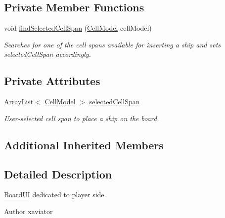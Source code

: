 \subsection*{Private Member Functions}
\begin{DoxyCompactItemize}
\item 
void \hyperlink{classbattleship2D_1_1ui_1_1BoardUIPlayer_a682280776c3f98231aa0624d783566cb}{find\-Selected\-Cell\-Span} (\hyperlink{classbattleship2D_1_1model_1_1CellModel}{Cell\-Model} cell\-Model)
\begin{DoxyCompactList}\small\item\em Searches for one of the cell spans available for inserting a ship and sets selected\-Cell\-Span accordingly. \end{DoxyCompactList}\end{DoxyCompactItemize}
\subsection*{Private Attributes}
\begin{DoxyCompactItemize}
\item 
Array\-List$<$ \hyperlink{classbattleship2D_1_1model_1_1CellModel}{Cell\-Model} $>$ \hyperlink{classbattleship2D_1_1ui_1_1BoardUIPlayer_a3a625b31f12b372502d3f48e07a9bc59}{selected\-Cell\-Span}
\begin{DoxyCompactList}\small\item\em User-\/selected cell span to place a ship on the board. \end{DoxyCompactList}\end{DoxyCompactItemize}
\subsection*{Additional Inherited Members}


\subsection{Detailed Description}
\hyperlink{classbattleship2D_1_1ui_1_1BoardUI}{Board\-U\-I} dedicated to player side. 

\begin{DoxyAuthor}{Author}
xaviator 
\end{DoxyAuthor}


